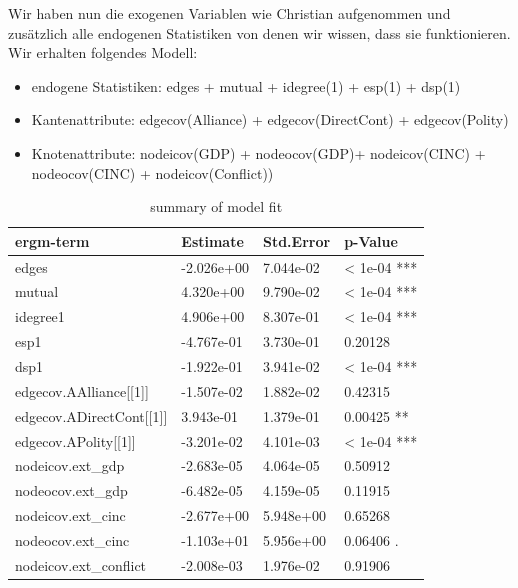 \documentclass[a4paper,ngerman,oneside,titlepage,bibliography=totoc,11pt]{scrreprt}
\begin{document}
Wir haben nun die exogenen Variablen wie Christian aufgenommen und zusätzlich alle endogenen Statistiken von denen wir wissen, dass sie funktionieren.
Wir erhalten folgendes Modell:
\begin{itemize}
\item endogene Statistiken: edges + mutual + idegree(1) + esp(1) + dsp(1)
\item Kantenattribute: edgecov(Alliance) + edgecov(DirectCont)  + edgecov(Polity)
\item Knotenattribute: nodeicov(GDP) + nodeocov(GDP)+ nodeicov(CINC) + nodeocov(CINC) + nodeicov(Conflict))
\end{itemize}
\begin{table}[h]
	\centering
	\caption{summary of model fit}
		\begin{tabular}{l|l|l|l}
		
		\hline
		ergm-term 						    & Estimate      & Std.Error   & p-Value 				\\
		\hline
    edges                     & -2.026e+00    & 7.044e-02   &    < 1e-04 ***  \\
    mutual                    &  4.320e+00    & 9.790e-02   &    < 1e-04 ***  \\
    idegree1                  &  4.906e+00    & 8.307e-01   &    < 1e-04 ***  \\
    esp1                      & -4.767e-01    & 3.730e-01   &    0.20128      \\
    dsp1                      & -1.922e-01    & 3.941e-02   &    < 1e-04 ***  \\
    edgecov.AAlliance[[1]]    & -1.507e-02    & 1.882e-02   &    0.42315      \\
    edgecov.ADirectCont[[1]]  &  3.943e-01    & 1.379e-01   &    0.00425 **   \\
    edgecov.APolity[[1]]      & -3.201e-02    & 4.101e-03   &    < 1e-04 ***  \\
    nodeicov.ext\_gdp          & -2.683e-05    & 4.064e-05   &    0.50912      \\
    nodeocov.ext\_gdp          & -6.482e-05    & 4.159e-05   &    0.11915      \\
    nodeicov.ext\_cinc         & -2.677e+00    & 5.948e+00   &    0.65268      \\
    nodeocov.ext\_cinc         & -1.103e+01    & 5.956e+00   &    0.06406 .    \\
    nodeicov.ext\_conflict     & -2.008e-03    & 1.976e-02   &    0.91906      \\

		\hline
						
		\end{tabular}
	
	
\end{table}
\end{document}
